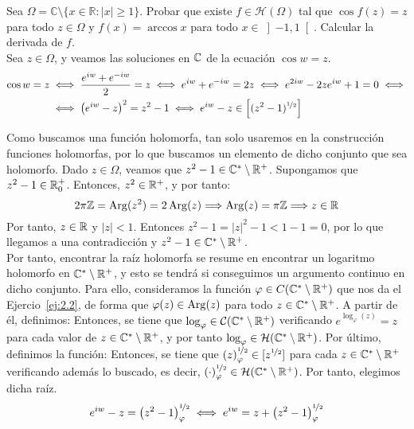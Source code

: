 \begin{ejercicio}
    Sea $\Omega = \mathbb{C} \setminus \{x \in \mathbb{R} : |x| \geq 1\}$. Probar que existe $f \in \mathcal{H}(\Omega)$ tal que $\cos f(z) = z$ para todo $z \in \Omega$ y $f(x) = \arccos x$ para todo $x \in \left] -1, 1 \right[$. Calcular la derivada de $f$.\\

    Sea $z\in \Omega$, y veamos las soluciones en $\mathbb{C}$ de la ecuación $\cos w = z$. \begin{align*}
        \cos w = z&\iff \dfrac{e^{iw}+e^{-iw}}{2} = z\iff e^{iw} + e^{-iw} = 2z\iff e^{2iw} - 2ze^{iw} + 1 = 0
        \iff\\&\iff \left(e^{iw}-z\right)^2 = z^2-1\iff e^{iw}-z\in \left[(z^2-1)^{\nicefrac{1}{2}}\right]
    \end{align*}

    Como buscamos una función holomorfa, tan solo usaremos en la construcción funciones holomorfas, por lo que buscamos un elemento de dicho conjunto que sea holomorfo. Dado $z\in \Omega$, veamos que $z^2-1\in \mathbb{C}^*\setminus\mathbb{R}^+$. Supongamos que $z^2-1\in \mathbb{R}^+_0$. Entonces, $z^2\in \mathbb{R}^+$, y por tanto:
    \begin{equation*}
        2\pi\mathbb{Z}=\operatorname{Arg}(z^2)=2\operatorname{Arg}(z)\Longrightarrow \operatorname{Arg}(z)=\pi\mathbb{Z}\Longrightarrow z\in \mathbb{R}
    \end{equation*}
    Por tanto, $z\in \mathbb{R}$ y $|z|<1$. Entonces $z^2-1=|z|^2-1<1-1=0$, por lo que llegamos a una contradicción y $z^2-1\in \mathbb{C}^*\setminus\mathbb{R}^+$.\\

    Por tanto, encontrar la raíz holomorfa se resume en encontrar un logaritmo holomorfo en $\mathbb{C}^*\setminus\mathbb{R}^+$, y esto se tendrá si conseguimos un argumento continuo en dicho conjunto. Para ello, consideramos la función $\varphi\in C(\mathbb{C}^*\setminus \mathbb{R}^+)$ que nos da el Ejercio~\ref{ej:2.2}, de forma que $\varphi(z)\in \operatorname{Arg}(z)$ para todo $z\in \mathbb{C}^*\setminus \mathbb{R}^+$. A partir de él, definimos:
    Entonces, se tiene que $\log_{\varphi}\in \mathcal{C}(\mathbb{C}^*\setminus \mathbb{R}^+)$ verificando $e^{\log_\varphi(z)}=z$ para cada valor de $z\in \mathbb{C}^*\setminus \mathbb{R}^+$, y por tanto $\log_{\varphi}\in \mathcal{H}(\mathbb{C}^*\setminus \mathbb{R}^+)$. Por último, definimos la función:
    Entonces, se tiene que $\left(z\right)^{\nicefrac{1}{2}}_{\varphi}\in [z^{\nicefrac{1}{2}}]$ para cada $z\in \mathbb{C}^*\setminus \mathbb{R}^+$ verificando además lo buscado, es decir, $\left(\cdot\right)^{\nicefrac{1}{2}}_{\varphi}\in \mathcal{H}(\mathbb{C}^*\setminus \mathbb{R}^+)$. Por tanto, elegimos dicha raíz.
    \begin{equation*}
        e^{iw} -z = \left(z^2-1\right)^{\nicefrac{1}{2}}_{\varphi}
        \iff e^{iw} = z + \left(z^2-1\right)^{\nicefrac{1}{2}}_{\varphi}
    \end{equation*}


\end{ejercicio}

